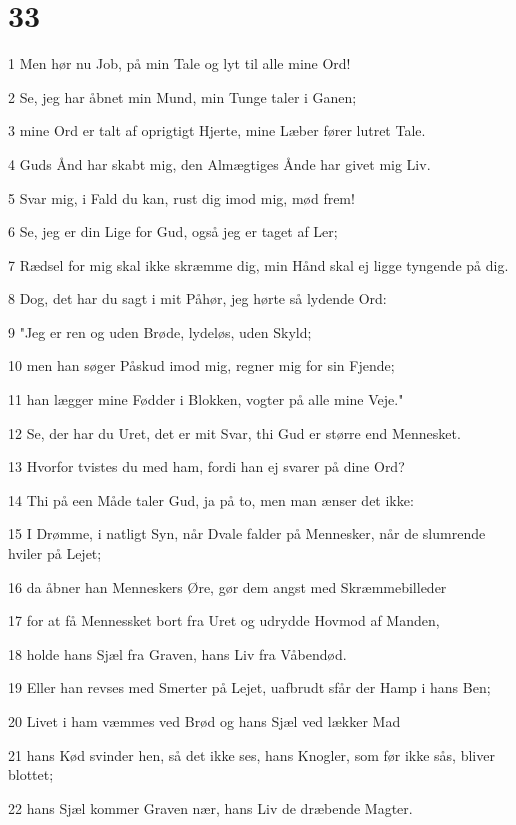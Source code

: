 \chapter{33}

\par 1 Men hør nu Job, på min Tale og lyt til alle mine Ord!
\par 2 Se, jeg har åbnet min Mund, min Tunge taler i Ganen;
\par 3 mine Ord er talt af oprigtigt Hjerte, mine Læber fører lutret Tale.
\par 4 Guds Ånd har skabt mig, den Almægtiges Ånde har givet mig Liv.
\par 5 Svar mig, i Fald du kan, rust dig imod mig, mød frem!
\par 6 Se, jeg er din Lige for Gud, også jeg er taget af Ler;
\par 7 Rædsel for mig skal ikke skræmme dig, min Hånd skal ej ligge tyngende på dig.
\par 8 Dog, det har du sagt i mit Påhør, jeg hørte så lydende Ord:
\par 9 "Jeg er ren og uden Brøde, lydeløs, uden Skyld;
\par 10 men han søger Påskud imod mig, regner mig for sin Fjende;
\par 11 han lægger mine Fødder i Blokken, vogter på alle mine Veje."
\par 12 Se, der har du Uret, det er mit Svar, thi Gud er større end Mennesket.
\par 13 Hvorfor tvistes du med ham, fordi han ej svarer på dine Ord?
\par 14 Thi på een Måde taler Gud, ja på to, men man ænser det ikke:
\par 15 I Drømme, i natligt Syn, når Dvale falder på Mennesker, når de slumrende hviler på Lejet;
\par 16 da åbner han Menneskers Øre, gør dem angst med Skræmmebilleder
\par 17 for at få Mennessket bort fra Uret og udrydde Hovmod af Manden,
\par 18 holde hans Sjæl fra Graven, hans Liv fra Våbendød.
\par 19 Eller han revses med Smerter på Lejet, uafbrudt sfår der Hamp i hans Ben;
\par 20 Livet i ham væmmes ved Brød og hans Sjæl ved lækker Mad
\par 21 hans Kød svinder hen, så det ikke ses, hans Knogler, som før ikke sås, bliver blottet;
\par 22 hans Sjæl kommer Graven nær, hans Liv de dræbende Magter.
